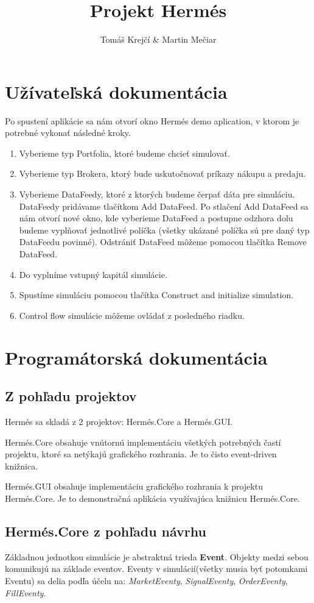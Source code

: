 \documentclass[a4paper]{article}
\title{Projekt Hermés}
\author{Tomáš Krejčí \& Martin Mečiar}
\date{}
\begin{document}
\maketitle
\noindent\makebox[\linewidth]{\rule{\paperwidth}{0.4pt}}
\newpage
\section{Užívateľská dokumentácia}

Po spustení aplikácie sa nám otvorí okno Hermés demo aplication, v ktorom je potrebné vykonať následné kroky. 
\begin{enumerate}
\item Vyberieme typ Portfolia, ktoré budeme chcieť simulovať.
\item Vyberieme typ Brokera, ktorý bude uskutočnovať príkazy nákupu a predaju.
\item Vyberieme DataFeedy, ktoré z ktorých budeme čerpať dáta pre simuláciu. DataFeedy pridávame tlačítkom Add DataFeed. Po stlačení Add DataFeed sa nám otvorí nové okno, kde vyberieme DataFeed a postupne odzhora dolu budeme vyplňovať  jednotlivé políčka (všetky ukázané políčka sú pre daný typ DataFeedu povinné). Odstrániť DataFeed môžeme pomocou tlačítka Remove DataFeed.
\item Do vyplníme vstupný kapitál simulácie.
\item Spustíme simuláciu pomocou tlačítka Construct and initialize simulation.
\item Control flow simulácie môžeme ovládať z posledného riadku.
\end{enumerate}

\section{Programátorská dokumentácia}

\subsection{Z pohľadu projektov}
Hermés sa skladá z 2 projektov: Hermés.Core a Hermés.GUI. 

Hermés.Core obsahuje vnútornú implementáciu všetkých potrebných častí projektu, ktoré sa netýkajú grafického rozhrania. Je to čisto event-driven knižnica.

Hermés.GUI obsahuje implementáciu grafického rozhrania k projektu Hermés.Core. Je to demonstračná aplikácia využívajúca knižnicu Hermés.Core.


\subsection{Hermés.Core z pohľadu návrhu}
Základnou jednotkou simulácie je abstraktná trieda \textbf{Event}. Objekty medzi sebou komunikujú na základe eventov. Eventy v simulácií(všetky musia byť potomkami Eventu) sa delia podľa účelu na: \textit{MarketEventy}, \textit{SignalEventy}, \textit{OrderEventy}, \textit{FillEventy}. 
\end{document}
